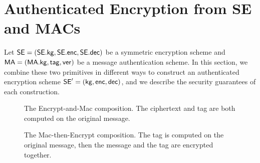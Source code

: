 \section{Authenticated Encryption from SE and MACs}
\label{sec:genericcomp}
Let ${\mathsf{SE}}=({\mathsf{SE}}.{\sf kg},{\mathsf{SE}}.{\sf enc},{\mathsf{SE}}.{\sf dec})$ be a symmetric encryption scheme and $\mathsf{MA}=(\mathsf{MA}.{\sf kg},\mathsf{tag},\mathsf{ver})$ be a message authentication scheme. In this section, we combine these two primitives in different ways to construct an authenticated encryption scheme ${\mathsf{SE}}'=({\sf kg},{\sf enc},{\sf dec})$, and we describe the security guarantees of each construction. 
\begin{figure}[h]
	\centering
	\caption{The Encrypt-and-Mac composition. The ciphertext and tag are both computed on the original message.}
\end{figure}
\begin{figure}[h]
	\centering
	\caption{The Mac-then-Encrypt composition. The tag is computed on the original message, then the message and the tag are encrypted together.}
\end{figure}
